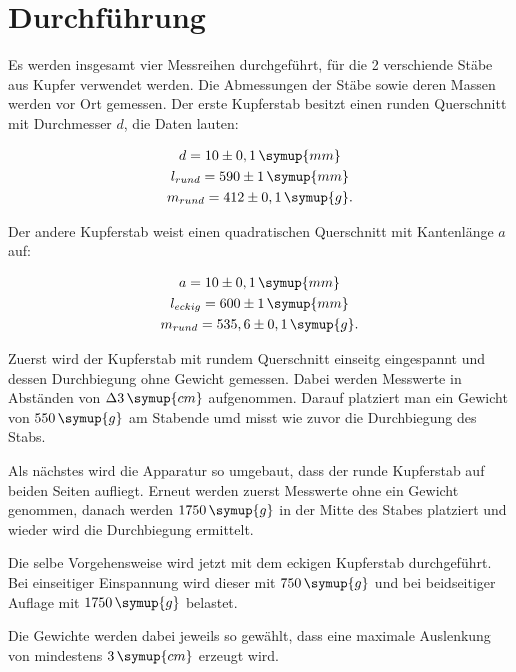 \section{Durchführung}
\label{sec:Durchführung}

Es werden insgesamt vier Messreihen durchgeführt, für die 2 verschiende Stäbe aus Kupfer verwendet werden.
Die Abmessungen der Stäbe sowie deren Massen werden vor Ort gemessen.
Der erste Kupferstab besitzt einen runden Querschnitt mit Durchmesser $d$, die Daten lauten:

\begin{gather}
    d=10\pm0,1\,\symup{mm} \notag \\
    l_{rund}=590\pm1\,\symup{mm} \notag \\
    m_{rund}=412\pm0,1\,\symup{g} \notag.
\end{gather}

Der andere Kupferstab weist einen quadratischen Querschnitt mit Kantenlänge $a$ auf:

\begin{gather}
    a=10\pm0,1\,\symup{mm} \notag \\
    l_{eckig}=600\pm1\,\symup{mm} \notag \\
    m_{rund}=535,6\pm0,1\,\symup{g} \notag.
\end{gather}

Zuerst wird der Kupferstab mit rundem Querschnitt einseitg eingespannt und dessen Durchbiegung ohne Gewicht gemessen.
Dabei werden Messwerte in Abständen von $\Delta 3\,\symup{cm}$ aufgenommen.
Darauf platziert man ein Gewicht von $550\,\symup{g}$ am Stabende umd misst wie zuvor die Durchbiegung des Stabs.

Als nächstes wird die Apparatur so umgebaut, dass der runde Kupferstab auf beiden Seiten aufliegt.
Erneut werden zuerst Messwerte ohne ein Gewicht genommen, danach werden $1750\,\symup{g}$
in der Mitte des Stabes platziert und wieder wird die Durchbiegung ermittelt.

Die selbe Vorgehensweise wird jetzt mit dem eckigen Kupferstab durchgeführt.
Bei einseitiger Einspannung wird dieser mit $750\,\symup{g}$ und bei beidseitiger Auflage mit $1750\,\symup{g}$ belastet.

Die Gewichte werden dabei jeweils so gewählt, dass eine maximale Auslenkung von mindestens $3\,\symup{cm}$ erzeugt wird.